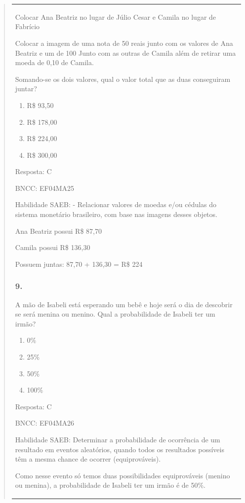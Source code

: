 \begin{enumerate}
\begin{escolha}
\begin{enumerate}
\begin{itemize}
\begin{itemize}
\begin{escolha}
\begin{quote}
\begin{escolha}
{\begin{longtable}[]{@{}l@{}}
\begin{itemize}
Colocar Ana Beatriz no lugar de Júlio Cesar e Camila no lugar de
Fabrício

Colocar a imagem de uma nota de 50 reais junto com os valores de Ana
Beatriz e um de 100 Junto com as outras de Camila além de retirar uma
moeda de 0,10 de Camila.

Somando-se os dois valores, qual o valor total que as duas conseguiram
juntar?

\begin{enumerate}
\def\labelenumi{\alph{enumi})}
\item
  R\$ 93,50
\item
  R\$ 178,00
\item
  R\$ 224,00
\item
  R\$ 300,00
\end{enumerate}

Resposta: C

BNCC: EF04MA25

Habilidade SAEB: - Relacionar valores de moedas e/ou cédulas do sistema
monetário brasileiro, com base nas imagens desses objetos.

Ana Beatriz possui R\$ 87,70

Camila possui R\$ 136,30

Possuem juntas: 87,70 + 136,30 = R\$ 224

\subsubsection{9.}\label{section-150}

A mão de Isabeli está esperando um bebê e hoje será o dia de descobrir
se será menina ou menino. Qual a probabilidade de Isabeli ter um irmão?

\begin{enumerate}
\def\labelenumi{\alph{enumi})}
\item
  0\%
\item
  25\%
\item
  50\%
\item
  100\%
\end{enumerate}

Resposta: C

BNCC: EF04MA26

Habilidade SAEB: Determinar a probabilidade de ocorrência de um
resultado em eventos aleatórios, quando todos os resultados possíveis
têm a mesma chance de ocorrer (equiprováveis).

Como nesse evento só temos duas possibilidades equiprováveis (menino ou
menina), a probabilidade de Isabeli ter um irmão é de 50\%.


\end{itemize}
\end{longtable}}
\end{escolha}
\end{quote}
\end{escolha}
\end{itemize}
\end{itemize}
\end{enumerate}
\end{escolha}
\end{enumerate}
